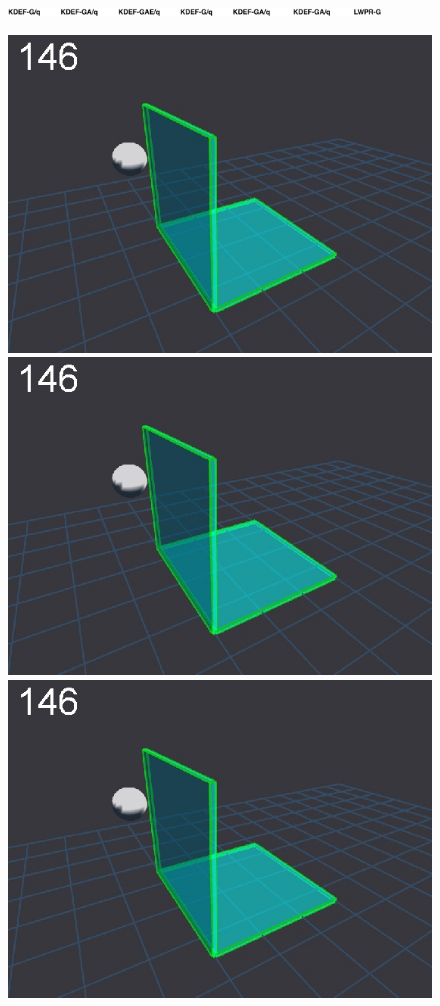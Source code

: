 \newlength{\imgBXwid}
\setlength{\imgBXwid}{2.2cm}
\begin{figure}[tb]
\centerline{
\includegraphics[width=0.88\textwidth]{./fig14-conditions}
}
\centerline{
\includegraphics[width=\imgBXwid]{./B1_1exp_20_1}
\includegraphics[width=\imgBXwid]{./B1_2exp_20_1}
\includegraphics[width=\imgBXwid]{./B1_3exp_20_1}
}
\end{figure}
